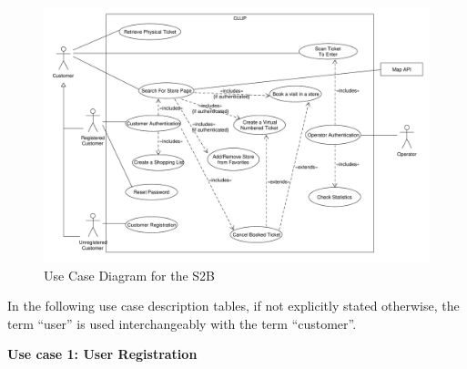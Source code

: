 \begin{figure}[H]
    \includegraphics[width=\textwidth]{Images/UML_use_case.pdf}
    \caption{\label{fig:Use_Case_Diag}Use Case Diagram for the S2B}
\end{figure}


\medskip
\clearpage
In the following use case description tables, if not explicitly stated otherwise, the term ``user'' is used interchangeably with the term ``customer''.
\medskip

\textbf{Use case 1: User Registration}
\smallskip

